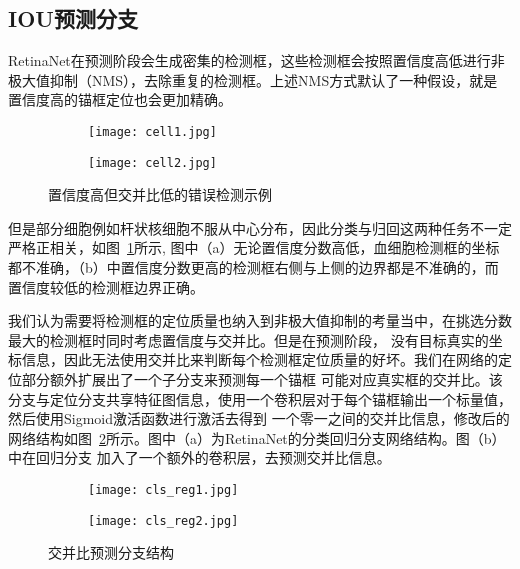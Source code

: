 \subsection{IOU预测分支}
RetinaNet在预测阶段会生成密集的检测框，这些检测框会按照置信度高低进行非极大值抑制（NMS），去除重复的检测框。上述NMS方式默认了一种假设，就是
置信度高的锚框定位也会更加精确。
\begin{figure}[htbp]
	\centering
  \begin{subfigure}{0.35\linewidth}
    \centering
    \texttt{[image: cell1.jpg]}
    \caption{}
  \end{subfigure}
	\centering
	\begin{subfigure}{0.35\linewidth}
		\centering
		\texttt{[image: cell2.jpg]}
    \caption{}
	\end{subfigure}
  \caption{置信度高但交并比低的错误检测示例}
	\label{fig:detect_err}
\end{figure}
但是部分细胞例如杆状核细胞不服从中心分布，因此分类与归回这两种任务不一定严格正相关\cite{he2019bounding}，如图~\ref{fig:detect_err}所示,
图中（a）无论置信度分数高低，血细胞检测框的坐标都不准确，（b）中置信度分数更高的检测框右侧与上侧的边界都是不准确的，而置信度较低的检测框边界正确。

我们认为需要将检测框的定位质量也纳入到非极大值抑制的考量当中，在挑选分数最大的检测框时同时考虑置信度与交并比。但是在预测阶段，
没有目标真实的坐标信息，因此无法使用交并比来判断每个检测框定位质量的好坏。我们在网络的定位部分额外扩展出了一个子分支来预测每一个锚框
可能对应真实框的交并比。该分支与定位分支共享特征图信息，使用一个卷积层对于每个锚框输出一个标量值，然后使用Sigmoid激活函数进行激活去得到
一个零一之间的交并比信息，修改后的网络结构如图~\ref{fig:cls_reg}所示。图中（a）为RetinaNet的分类回归分支网络结构。图（b）中在回归分支
加入了一个额外的卷积层，去预测交并比信息。
\begin{figure}[htbp]
  \centering
	\begin{subfigure}{0.45\linewidth}
		\centering
		\texttt{[image: cls\_reg1.jpg]}
    \caption{}
	\end{subfigure}
  \centering
	\begin{subfigure}{0.45\linewidth}
		\centering
		\texttt{[image: cls\_reg2.jpg]}
    \caption{}
	\end{subfigure}
  \caption{交并比预测分支结构}
	\label{fig:cls_reg}
\end{figure}

